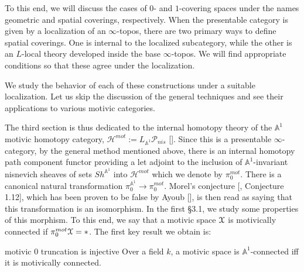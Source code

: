To this end, we will discuss the cases of $0$- and $1$-covering spaces under the names geometric and spatial coverings, respectively. When the presentable category is given by a localization of an $\infty$-topos, there are two primary ways to define spatial coverings. One is internal to the localized subcategory, while the other is an $L$-local theory developed inside the base $\infty$-topos. We will find appropriate conditions so that these agree under the localization.

We study the behavior of each of these constructions under a suitable localization. Let us skip the discussion of the general techniques and see their applications to various motivic categories. 

The third section is thus dedicated to the internal homotopy theory of the $\mathbb{A}^1$ motivic homotopy category, $\mathcal{H}^{mot}:=L_{\mathbb{A}^1}\mathcal{P}_{nis}$ [\cite{morel19991}]. Since this is a presentable $\infty$-category, by the general method mentioned above, there is an internal homotopy path component functor providing a let adjoint to the inclusion of $\mathbb{A}^1$-invariant nisnevich sheaves of sets $Sh^{\mathbb{A}^1}$ into $\mathcal{H}^{mot}$ which we denote by $\pi_0^{mot}$. There is a canonical natural transformation $\pi_0^{\mathbb{A}^1}\to \pi_0^{mot}$. Morel's conjecture [\cite{morel2012a1}, Conjecture 1.12], which has been proven to be false by Ayoub [\cite{ayoubcounterexamples}], is then read as saying that this transformation is an isomorphism. In the first \S3.1, we study some properties of this morphism. To this end, we say that a motivic space $\EuScript{X}$ is motivically connected if $\pi_0^{mot}\EuScript{X}=*$. The first key result we obtain is:
\begin{recall*}{motivic 0 truncation is injective}
  Over a field $k$, a motivic space is $\mathbb{A}^1$-connected iff it is motivically connected. 
\end{recall*}

